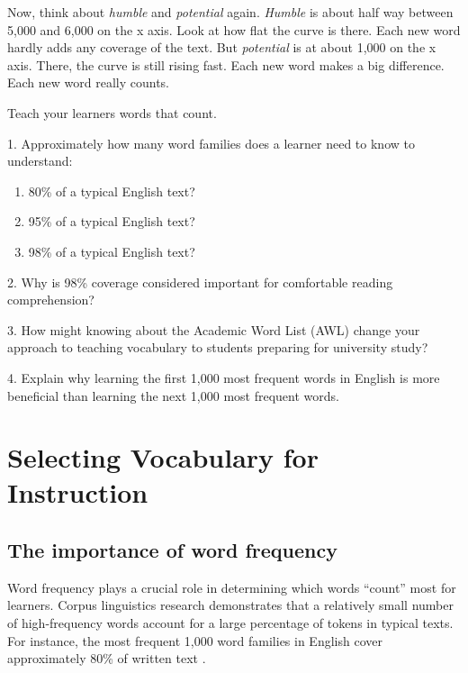 Now, think about \textit{humble} and \textit{potential} again. \textit{Humble} is about half way between 5,000 and 6,000 on the x axis. Look at how flat the curve is there. Each new word hardly adds any coverage of the text. But \textit{potential} is at about 1,000 on the x axis. There, the curve is still rising fast. Each new word makes a big difference. Each new word really counts.

Teach your learners words that count.

\begin{tcolorbox}[title=Exercise: Vocabulary Size and Coverage, colback=white, colframe=purple!75!black, fonttitle=\bfseries]
1. Approximately how many word families does a learner need to know to understand:
   \begin{enumerate}
      \item 80\% of a typical English text?
      \item 95\% of a typical English text?
      \item 98\% of a typical English text?
   \end{enumerate}

2. Why is 98\% coverage considered important for comfortable reading comprehension?

3. How might knowing about the Academic Word List (AWL) change your approach to teaching vocabulary to students preparing for university study?

4. Explain why learning the first 1,000 most frequent words in English is more beneficial than learning the next 1,000 most frequent words.
\end{tcolorbox}

\section{Selecting Vocabulary for Instruction} \label{sec:selecting-vocab}
\subsection*{The importance of word frequency}

Word frequency plays a crucial role in determining which words ``count'' most for learners. Corpus linguistics research demonstrates that a relatively small number of high-frequency words account for a large percentage of tokens in typical texts. For instance, the most frequent 1,000 word families in English cover approximately 80\% of written text \citep{Nation2013}.

